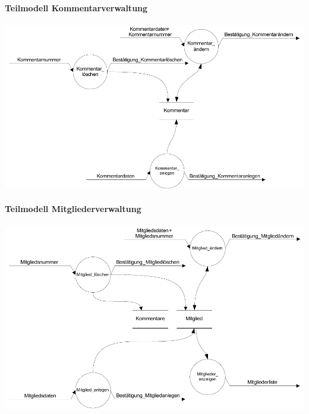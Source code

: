 \paragraph{Teilmodell Kommentarverwaltung}
\includegraphics[scale=0.85]{teilmodell_kommentarverwaltung}

\paragraph{Teilmodell Mitgliederverwaltung}
\includegraphics[scale=0.85]{teilmodell_mitgliederverwaltung}
\newpage

